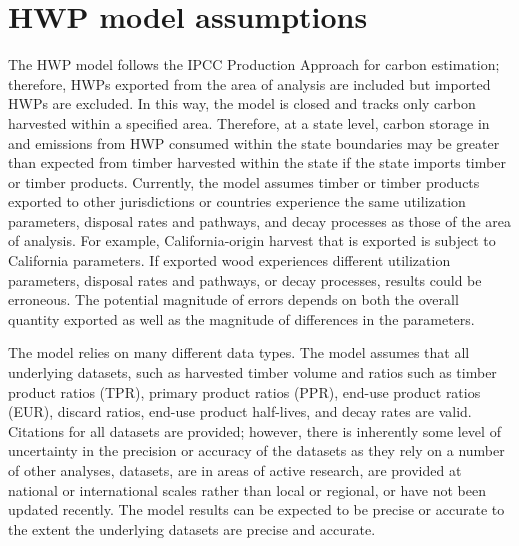 \documentclass[
  openany]{book}
\begin{document}
\hypertarget{int-assump}{%
\section{HWP model assumptions}\label{int-assump}}

The HWP model follows the IPCC Production Approach for carbon
estimation; therefore, HWPs exported from the area of analysis are
included but imported HWPs are excluded. In this way, the model is
closed and tracks only carbon harvested within a specified area.
Therefore, at a state level, carbon storage in and emissions from HWP
consumed within the state boundaries may be greater than expected from
timber harvested within the state if the state imports timber or timber
products. Currently, the model assumes timber or timber products
exported to other jurisdictions or countries experience the same
utilization parameters, disposal rates and pathways, and decay processes
as those of the area of analysis. For example, California-origin harvest
that is exported is subject to California parameters. If exported wood
experiences different utilization parameters, disposal rates and
pathways, or decay processes, results could be erroneous. The potential
magnitude of errors depends on both the overall quantity exported as
well as the magnitude of differences in the parameters.

The model relies on many different data types. The model assumes that
all underlying datasets, such as harvested timber volume and ratios such
as timber product ratios (TPR), primary product ratios (PPR), end-use
product ratios (EUR), discard ratios, end-use product half-lives, and
decay rates are valid. Citations for all datasets are provided; however,
there is inherently some level of uncertainty in the precision or
accuracy of the datasets as they rely on a number of other analyses,
datasets, are in areas of active research, are provided at national or
international scales rather than local or regional, or have not been
updated recently. The model results can be expected to be precise or
accurate to the extent the underlying datasets are precise and accurate.
\end{document}
